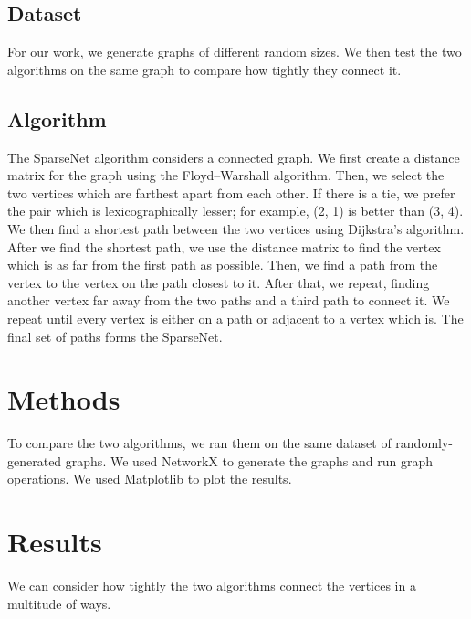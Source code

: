 \documentclass[conference]{IEEEtran}
\begin{document}
\subsection{Dataset}

For our work, we generate graphs of different random sizes.
We then test the two algorithms on the same graph to compare how tightly they connect it.

\subsection{Algorithm}

The SparseNet algorithm considers a connected graph.
We first create a distance matrix for the graph using the Floyd–Warshall algorithm.
Then, we select the two vertices which are farthest apart from each other.
If there is a tie, we prefer the pair which is lexicographically lesser; for example, (2, 1) is better than (3, 4).
We then find a shortest path between the two vertices using Dijkstra's algorithm.
After we find the shortest path, we use the distance matrix to find the vertex which is as far from the first path as possible.
Then, we find a path from the vertex to the vertex on the path closest to it.
After that, we repeat, finding another vertex far away from the two paths and a third path to connect it.
We repeat until every vertex is either on a path or adjacent to a vertex which is.
The final set of paths forms the SparseNet.

\section{Methods}

To compare the two algorithms, we ran them on the same dataset of randomly-generated graphs.
We used NetworkX to generate the graphs and run graph operations.
We used Matplotlib to plot the results.

\section{Results}

We can consider how tightly the two algorithms connect the vertices in a multitude of ways.
\end{document}
